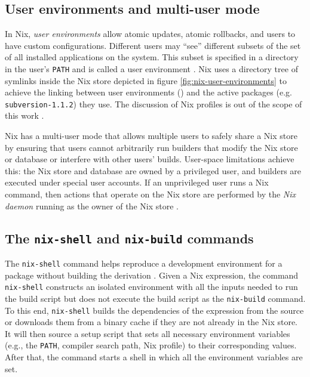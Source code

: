 \subsection{User environments and multi-user mode}\label{Nix-multi-user}
In Nix, \emph{user environments} allow atomic updates, atomic rollbacks, and users to have custom configurations. Different users may ``see'' different subsets of the set of all installed applications on the system. This subset is specified in a directory in the user's \verb|PATH| and is called a user environment \cite{NixIntroduction}. 
Nix uses a directory tree of symlinks inside the Nix store depicted in figure \ref{fig:nix-user-environments} to achieve the linking between user environments () and the active packages (e.g. \verb|subversion-1.1.2|) they use. The discussion of Nix profiles is out of the scope of this work \cite{Profiles}. %

Nix has a multi-user mode that allows multiple users to safely share a Nix store by ensuring that users cannot arbitrarily run builders that modify the Nix store or database or interfere with other users' builds. User-space limitations achieve this: the Nix store and database are owned by a privileged user, and builders are executed under special user accounts. If an unprivileged user runs a Nix command, then actions that operate on the Nix store are performed by the \emph{Nix daemon} running as the owner of the Nix store \cite{NixMultiUser}. 

\subsection{The \textbf{\texttt{nix-shell}} and \textbf{\texttt{nix-build}} commands}\label{nix-shell&nix-build}
The \verb|nix-shell| command helps reproduce a development environment for a package without building the derivation \cite{NixIntroduction}\cite{NixShell}. Given a Nix expression, the command \verb|nix-shell| constructs an isolated environment with all the inputs needed to run the build script but does not execute the build script as the \verb|nix-build| command. To this end, \verb|nix-shell| builds the dependencies of the expression from the source or downloads them from a binary cache if they are not already in the Nix store. It will then source a setup script that sets all necessary environment variables (e.g., the \verb|PATH|, compiler search path, Nix profile) to their corresponding values. After that, the command starts a shell in which all the environment variables are set.

